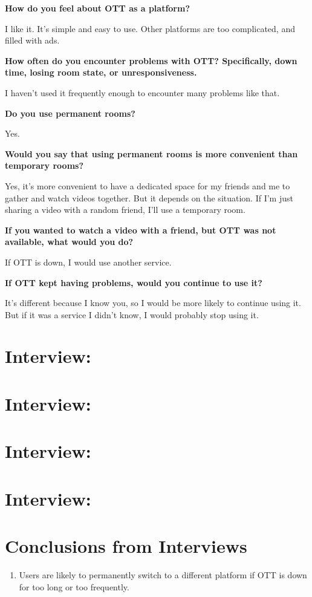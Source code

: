\textbf{How do you feel about OTT as a platform?}

I like it. It's simple and easy to use. Other platforms are too complicated, and filled with ads.

\textbf{How often do you encounter problems with OTT? Specifically, down time, losing room state, or unresponsiveness.}

I haven't used it frequently enough to encounter many problems like that.

\textbf{Do you use permanent rooms?}

Yes.

\textbf{Would you say that using permanent rooms is more convenient than temporary rooms?}

Yes, it's more convenient to have a dedicated space for my friends and me to gather and watch videos together. But it depends on the situation. If I'm just sharing a video with a random friend, I'll use a temporary room.

\textbf{If you wanted to watch a video with a friend, but OTT was not available, what would you do?}

If OTT is down, I would use another service.

\textbf{If OTT kept having problems, would you continue to use it?}

It's different because I know you, so I would be more likely to continue using it. But if it was a service I didn't know, I would probably stop using it.

\section{Interview: }
\section{Interview: }
\section{Interview: }
\section{Interview: }

\section{Conclusions from Interviews}

\begin{enumerate}
  \item Users are likely to permanently switch to a different platform if OTT is down for too long or too frequently.
\end{enumerate}